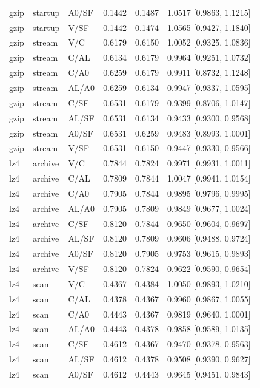 \begin{longtable}{lllrrl}
gzip & startup & A0/SF & 0.1442 & 0.1487 & 1.0517 [0.9863, 1.1215] \\
gzip & startup & V/SF & 0.1442 & 0.1474 & 1.0565 [0.9427, 1.1840] \\
gzip & stream & V/C & 0.6179 & 0.6150 & 1.0052 [0.9325, 1.0836] \\
gzip & stream & C/AL & 0.6134 & 0.6179 & 0.9964 [0.9251, 1.0732] \\
gzip & stream & C/A0 & 0.6259 & 0.6179 & 0.9911 [0.8732, 1.1248] \\
gzip & stream & AL/A0 & 0.6259 & 0.6134 & 0.9947 [0.9337, 1.0595] \\
gzip & stream & C/SF & 0.6531 & 0.6179 & 0.9399 [0.8706, 1.0147] \\
gzip & stream & AL/SF & 0.6531 & 0.6134 & 0.9433 [0.9300, 0.9568] \\
gzip & stream & A0/SF & 0.6531 & 0.6259 & 0.9483 [0.8993, 1.0001] \\
gzip & stream & V/SF & 0.6531 & 0.6150 & 0.9447 [0.9330, 0.9566] \\
lz4 & archive & V/C & 0.7844 & 0.7824 & 0.9971 [0.9931, 1.0011] \\
lz4 & archive & C/AL & 0.7809 & 0.7844 & 1.0047 [0.9941, 1.0154] \\
lz4 & archive & C/A0 & 0.7905 & 0.7844 & 0.9895 [0.9796, 0.9995] \\
lz4 & archive & AL/A0 & 0.7905 & 0.7809 & 0.9849 [0.9677, 1.0024] \\
lz4 & archive & C/SF & 0.8120 & 0.7844 & 0.9650 [0.9604, 0.9697] \\
lz4 & archive & AL/SF & 0.8120 & 0.7809 & 0.9606 [0.9488, 0.9724] \\
lz4 & archive & A0/SF & 0.8120 & 0.7905 & 0.9753 [0.9615, 0.9893] \\
lz4 & archive & V/SF & 0.8120 & 0.7824 & 0.9622 [0.9590, 0.9654] \\
lz4 & scan & V/C & 0.4367 & 0.4384 & 1.0050 [0.9893, 1.0210] \\
lz4 & scan & C/AL & 0.4378 & 0.4367 & 0.9960 [0.9867, 1.0055] \\
lz4 & scan & C/A0 & 0.4443 & 0.4367 & 0.9819 [0.9640, 1.0001] \\
lz4 & scan & AL/A0 & 0.4443 & 0.4378 & 0.9858 [0.9589, 1.0135] \\
lz4 & scan & C/SF & 0.4612 & 0.4367 & 0.9470 [0.9378, 0.9563] \\
lz4 & scan & AL/SF & 0.4612 & 0.4378 & 0.9508 [0.9390, 0.9627] \\
lz4 & scan & A0/SF & 0.4612 & 0.4443 & 0.9645 [0.9451, 0.9843] \\

\end{longtable}
